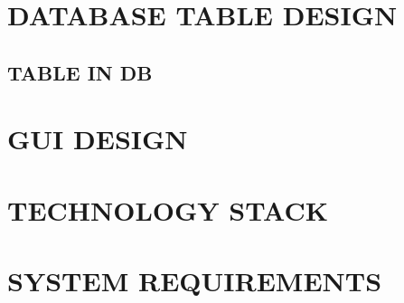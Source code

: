 \newpage
\section{DATABASE TABLE DESIGN}
\subsection{TABLE IN DB}


\section{GUI DESIGN}

\section{TECHNOLOGY STACK}

\section{SYSTEM REQUIREMENTS}